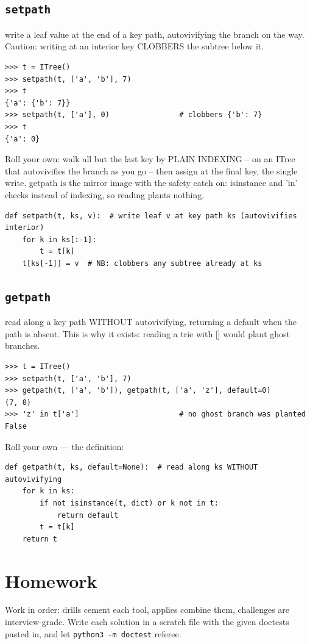 \documentclass[10pt,letterpaper]{book}
\begin{document}
\subsection{\texttt{setpath}}\label{def:setpath}
write a leaf value at the end of a key path, autovivifying the branch on the way. Caution: writing at an interior key CLOBBERS the subtree below it.
\begin{lstlisting}[style=ex]
>>> t = ITree()
>>> setpath(t, ['a', 'b'], 7)
>>> t
{'a': {'b': 7}}
>>> setpath(t, ['a'], 0)                # clobbers {'b': 7}
>>> t
{'a': 0}
\end{lstlisting}

Roll your own: walk all but the last key by PLAIN INDEXING -- on an ITree that autovivifies the branch as you go -- then assign at the final key, the single write. getpath is the mirror image with the safety catch on: isinstance and 'in' checks instead of indexing, so reading plants nothing.

\begin{lstlisting}[style=ex]
def setpath(t, ks, v):  # write leaf v at key path ks (autovivifies interior)
    for k in ks[:-1]:
        t = t[k]
    t[ks[-1]] = v  # NB: clobbers any subtree already at ks
\end{lstlisting}
\subsection{\texttt{getpath}}\label{def:getpath}
read along a key path WITHOUT autovivifying, returning a default when the path is absent. This is why it exists: reading a trie with [] would plant ghost branches.
\begin{lstlisting}[style=ex]
>>> t = ITree()
>>> setpath(t, ['a', 'b'], 7)
>>> getpath(t, ['a', 'b']), getpath(t, ['a', 'z'], default=0)
(7, 0)
>>> 'z' in t['a']                       # no ghost branch was planted
False
\end{lstlisting}

Roll your own --- the definition:

\begin{lstlisting}[style=ex]
def getpath(t, ks, default=None):  # read along ks WITHOUT autovivifying
    for k in ks:
        if not isinstance(t, dict) or k not in t:
            return default
        t = t[k]
    return t
\end{lstlisting}
\section{Homework}
Work in order: drills cement each tool, applies combine them,
challenges are interview-grade. Write each solution in a scratch file with
the given doctests pasted in, and let \texttt{python3 -m doctest} referee.
\end{document}
